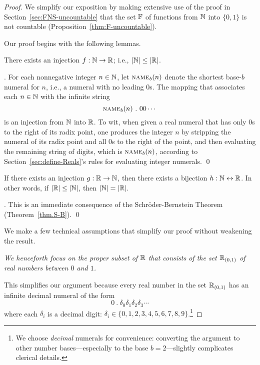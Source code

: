 \begin{proof}
We simplify our exposition by making extensive use of the proof in
Section~\ref{sec:FNS-uncountable} that the set $\mathbb{F}$ of functions from
$\mathbb{N}$ into $\{0,1\}$ is not countable (Proposition~\ref{thm:F-uncountable}).

Our proof begins with the following lemmas.

\begin{lemma}
\label{lem:N-leq-R}
There exists an injection $f: \mathbb{N} \rightarrow \mathbb{R}$; i.e., $|\mathbb{N}| \leq |\mathbb{R}|$.
\end{lemma}

.
For each nonnegative integer $n \in \mathbb{N}$, let $\mbox{\sc name}_b(n)$
denote the shortest base-$b$ numeral for $n$, i.e., a numeral with no
leading $0$s.  The mapping that associates each $n \in \mathbb{N}$ with the
infinite string
\[ \mbox{\sc name}_b(n) \ . \ 00 \cdots \]
is an injection from $\mathbb{N}$ into $\mathbb{R}$.  To wit, when given a real
numeral that has only $0$s to the right of its radix point, one
produces the integer $n$ by stripping the numeral of its radix point
and all $0$s to the right of the point, and then evaluating the
remaining string of digits, which is $\mbox{\sc name}_b(n)$, according
to Section~\ref{sec:define-Reals}'s rules for evaluating integer numerals.  \qed

\begin{lemma}
\label{lem:N-=-R}
If there exists an injection $g: \mathbb{R} \rightarrow \mathbb{N}$, then there exists a bijection 
$h: \mathbb{N} \leftrightarrow \mathbb{R}$.  In other words, if $|\mathbb{R}| \leq |\mathbb{N}|$, then $|\mathbb{N}| = |\mathbb{R}|$.
\end{lemma}

.
This is an immediate consequence of the Schr\"{o}der-Bernstein Theorem
(Theorem~\ref{thm.S-B}).  \qed

\medskip

We make a few technical assumptions that simplify our proof without weakening the result.

\noindent
{\em We henceforth focus on the proper subset of $\mathbb{R}$ that consists of
  the set $\mathbb{R}_{(0,1)}$ of real numbers between $0$ and $1$.}

This simplifies our argument because every real number in the set
$\mathbb{R}_{(0,1)}$ has an infinite decimal numeral of the form
\[ 0 \ . \ \delta_0 \delta_1 \delta_2 \delta_3 \cdots \]
where each $\delta_i$ is a decimal digit: $\delta_i \in \{0, 1, 2, 3,
4, 5, 6, 7, 8, 9\}$.\footnote{We choose {\em decimal} numerals for
  convenience: converting the argument to other number
  bases---especially to the base $b=2$---slightly complicates clerical
  details.}


\end{proof}
